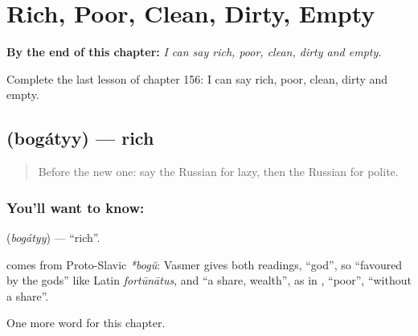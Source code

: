 
\chapter{Rich, Poor, Clean, Dirty, Empty}
\label{ch:ru-rich-poor-clean-dirty-empty}

\begin{chapteropening}
\textbf{By the end of this chapter:} \emph{I can say rich, poor, clean, dirty and empty.}

Complete the last lesson of chapter 156: I can say rich, poor, clean, dirty and empty.
\end{chapteropening}

\section[\texorpdfstring{\ru{богатый} (bogátyy)}{богатый (bogátyy)}]{ (bogátyy) — rich}

\label{lesson:RU-C156-bogatyy}



\begin{quote}
Before the new one: say the Russian for lazy, then the Russian for polite.
\end{quote}

\subsection*{You'll want to know: }
\textbf{} (\emph{bogátyy}) — \textquotedblleft{}rich\textquotedblright{}.

\begin{cousinweb}
\textbf{} comes from Proto-Slavic \emph{*bogŭ}: Vasmer gives both readings, \textquotedblleft{}god\textquotedblright{}, so \textquotedblleft{}favoured by the gods\textquotedblright{} like Latin \emph{fortūnātus}, and \textquotedblleft{}a share, wealth\textquotedblright{}, as in \emph{}, \textquotedblleft{}poor\textquotedblright{}, \textquotedblleft{}without a share\textquotedblright{}.
\end{cousinweb}

\begin{grammarlens}[title={What you've built}]
One more word for this chapter.
\end{grammarlens}

